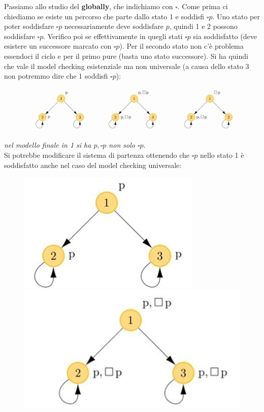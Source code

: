 \documentclass[a4paper,12pt, oneside]{book}
\begin{document}
Passiamo allo studio del \textbf{globally}, che indichiamo con $\square$.
Come prima ci chiediamo se esiste un percorso che parte dallo stato 1 e soddisfi
$\square p$. Uno stato per poter soddisfare $\square p$ necessariamente deve
soddisfare $p$, quindi 1 e 2 possono soddisfare $\square p$. Verifico poi se
effettivamente in quegli stati $\square p$ sia soddisfatto (deve esistere un
successore marcato con $\square p$). Per il secondo stato non c'è problema
essendoci il ciclo e per il primo pure (basta uno stato successore).
\newpage
Si ha quindi che vale il model checking esistenziale ma non universale (a causa
dello stato 3 non potremmo dire che 1 soddisfi $\square p$):
\begin{figure}[H]
  \centering
  \includegraphics[scale = 0.3]{img/pl10.jpg} 
\end{figure}
\textit{nel modello finale in 1 si ha $p,\square p$ non solo $\square p$}.\\
Si potrebbe modificare il sistema di partenza ottenendo che $\square p$ nello
stato 1 è soddisfatto anche nel caso del model checking universale:
\begin{figure}[H]
  \centering
  \includegraphics[scale = 0.4]{img/pl11.jpg}
  \includegraphics[scale = 0.4]{img/pl12.jpg}
\end{figure}
\end{document}
